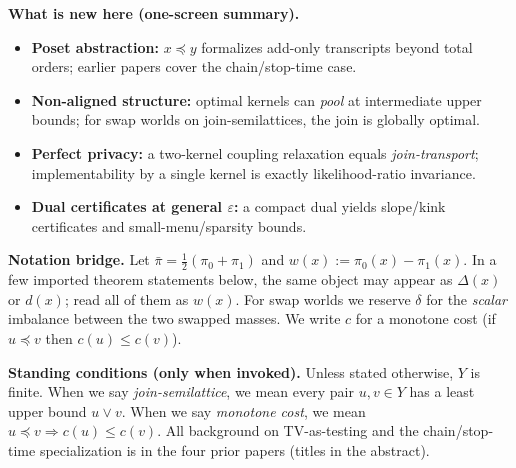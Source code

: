 \documentclass[11pt]{article}
\theoremstyle{definition}
\theoremstyle{remark}
\begin{document}
\vspace{0.25em}\noindent
\textbf{What is new here (one-screen summary).}
\begin{itemize}[leftmargin=*]
\item \textbf{Poset abstraction:} $x\preceq y$ formalizes add-only transcripts beyond total orders; earlier papers cover the chain/stop-time case.
\item \textbf{Non-aligned structure:} optimal kernels can \emph{pool} at intermediate upper bounds; for swap worlds on join-semilattices, the join is globally optimal.
\item \textbf{Perfect privacy:} a two-kernel coupling relaxation equals \emph{join-transport}; implementability by a single kernel is exactly likelihood-ratio invariance.
\item \textbf{Dual certificates at general $\varepsilon$:} a compact dual yields slope/kink certificates and small-menu/sparsity bounds.
\end{itemize}

\noindent
\textbf{Notation bridge.} Let $\bar\pi=\tfrac12(\pi_0+\pi_1)$ and $w(x):=\pi_0(x)-\pi_1(x)$.
In a few imported theorem statements below, the same object may appear as $\Delta(x)$ or $d(x)$; read all of them as $w(x)$.
For swap worlds we reserve $\delta$ for the \emph{scalar} imbalance between the two swapped masses.
We write $c$ for a monotone cost (if $u\preceq v$ then $c(u)\le c(v)$).

\vspace{0.25em}\noindent
\textbf{Standing conditions (only when invoked).}
Unless stated otherwise, $Y$ is finite. When we say \emph{join-semilattice}, we mean every pair $u,v\in Y$ has a least upper bound $u\vee v$.
When we say \emph{monotone cost}, we mean $u\preceq v \Rightarrow c(u)\le c(v)$.
All background on TV-as-testing and the chain/stop-time specialization is in the four prior papers (titles in the abstract).
\end{document}
